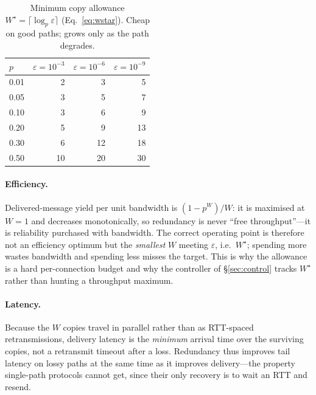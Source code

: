 \documentclass[10pt,twocolumn]{article}
\newcommand{\Wstar}{W^{\star}}
\begin{document}
\begin{table}[t]
\centering\small
\begin{tabular}{@{}lrrr@{}}
\toprule
$p$ & $\varepsilon{=}10^{-3}$ & $\varepsilon{=}10^{-6}$ & $\varepsilon{=}10^{-9}$\\
\midrule
0.01 & 2 & 3 & 5 \\
0.05 & 3 & 5 & 7 \\
0.10 & 3 & 6 & 9 \\
0.20 & 5 & 9 & 13 \\
0.30 & 6 & 12 & 18 \\
0.50 & 10 & 20 & 30 \\
\bottomrule
\end{tabular}
\caption{Minimum copy allowance $\Wstar=\lceil\log_p\varepsilon\rceil$
(Eq.~\ref{eq:wstar}). Cheap on good paths; grows only as the path degrades.}
\label{tab:wstar}
\end{table}

\paragraph{Efficiency.}
Delivered-message yield per unit bandwidth is $(1-p^{W})/W$: it is maximised at
$W{=}1$ and decreases monotonically, so redundancy is never ``free
throughput''---it is reliability purchased with bandwidth. The correct operating
point is therefore not an efficiency optimum but the \emph{smallest} $W$ meeting
$\varepsilon$, i.e.\ $\Wstar$; spending more wastes bandwidth and spending less
misses the target. This is why the allowance is a hard per-connection budget and
why the controller of \S\ref{sec:control} tracks $\Wstar$ rather than hunting a
throughput maximum.

\paragraph{Latency.}
Because the $W$ copies travel in parallel rather than as RTT-spaced
retransmissions, delivery latency is the \emph{minimum} arrival time over the
surviving copies, not a retransmit timeout after a loss. Redundancy thus improves
tail latency on lossy paths at the same time as it improves delivery---the
property single-path protocols cannot get, since their only recovery is to wait
an RTT and resend.
\end{document}
